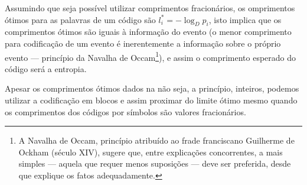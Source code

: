 Assumindo que seja possível utilizar comprimentos fracionários, os omprimentos
ótimos para as palavras de um código são $l^\ast_i = - \log_D p_i$, isto
implica que os comprimentos ótimos são iguais à informação do evento (o menor
comprimento para codificação de um evento é inerentemente a informação sobre o
próprio evento --- princípio da Navalha de Occam\footnote{
A Navalha de Occam, princípio atribuído ao frade franciscano Guilherme de Ockham 
(século XIV), sugere que, entre explicações concorrentes, a mais simples --- 
aquela que requer menos suposições --- deve ser preferida, desde que explique os 
fatos adequadamente. 
}), e assim o comprimento
esperado do código será a entropia.

Apesar os comprimentos ótimos dados na  não seja, a princípio,
inteiros, podemos utilizar a codificação em blocos e assim proximar do limite
ótimo mesmo quando os comprimentos dos códigos por símbolos são valores fracionários.

